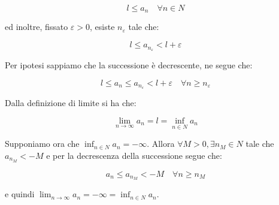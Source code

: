 \documentclass{article}
\begin{document}
$$l \leq a_n \quad \forall n \in N$$

ed inoltre, fissato $\varepsilon > 0$, esiste $n_\varepsilon$ tale che:

$$l \leq a_{n_\varepsilon} < l+\varepsilon$$

Per ipotesi sappiamo che la successione è decrescente, ne segue che:

$$l \leq a_n \leq a_{n_\varepsilon} < l+\varepsilon \quad \forall n \geq n_\varepsilon$$

Dalla definizione di limite si ha che:

$$\lim_{n \to \infty}a_n = l = \inf_{n \in N}a_n$$

Supponiamo ora che $\inf_{n \in N}a_n = -\infty$. Allora $\forall M > 0, \exists n_M \in N$ tale che $a_{n_M} < -M$ e per la decrescenza della successione segue che:

$$a_n \leq a_{n_M} < -M \quad \forall n \geq n_M$$

e quindi $\lim_{n \to \infty}a_n = -\infty = \inf_{n \in N}a_n$.
\end{document}
